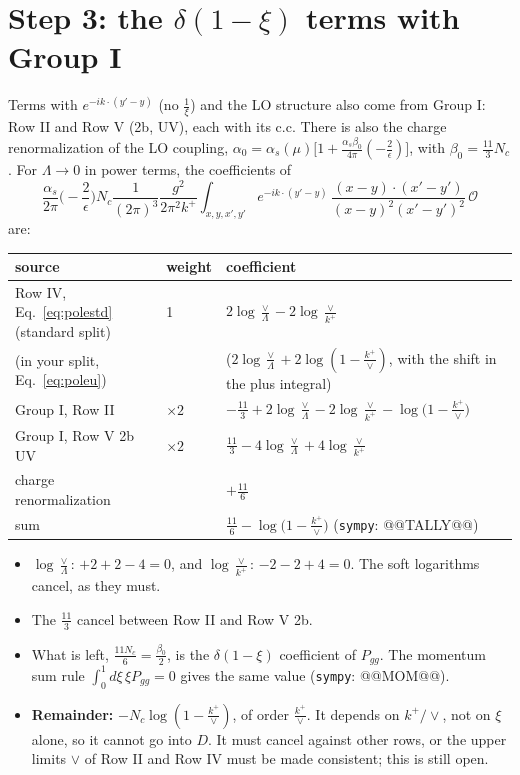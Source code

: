 \documentclass[10pt]{article}
\numberwithin{equation}{section}
\newcommand{\OO}{\mathcal O}
\newcommand{\preLO}{\frac{1}{(2\pi)^3}\frac{g^2}{2\pi^2k^+}}
\newcommand{\XX}{\frac{(x-y)\cdot(x'-y')}{(x-y)^{2}(x'-y')^{2}}}
\newcommand{\phone}{e^{-ik\cdot(y'-y)}}
\begin{document}
\section{Step 3: the \texorpdfstring{$\delta(1-\xi)$}{delta(1-xi)} terms with Group I}\label{sec:delta}
Terms with $\phone$ (no $\frac1\xi$) and the LO structure also come from Group I: Row II and Row V (2b, UV), each with its c.c. There is also the charge renormalization of the LO coupling, $\alpha_0=\alpha_s(\mu)\big[1+\frac{\alpha_s\beta_0}{4\pi}(-\frac2\epsilon)\big]$, with $\beta_0=\frac{11}{3}N_c$. For $\Lambda\to0$ in power terms, the coefficients of
\begin{equation*}
\frac{\alpha_s}{2\pi}\Big(-\frac{2}{\epsilon}\Big)N_c\preLO\int_{x,y,x',y'}\phone\,\XX\,\OO
\end{equation*}
are:
\begin{table}[H]\centering\small
\renewcommand{\arraystretch}{1.3}
\begin{tabular}{@{}lll@{}}\toprule
source & weight & coefficient\\\midrule
Row IV, Eq.~\eqref{eq:polestd} (standard split) & 1 & $2\log\frac{\vee}{\Lambda}-2\log\frac{\vee}{k^+}$\\
\quad (in your split, Eq.~\eqref{eq:poleu}) & & \quad ($2\log\frac{\vee}{\Lambda}+2\log(1-\frac{k^+}{\vee})$, with the shift in the plus integral)\\
Group I, Row II & $\times2$ & $-\frac{11}{3}+2\log\frac{\vee}{\Lambda}-2\log\frac{\vee}{k^+}-\log\big(1-\frac{k^+}{\vee}\big)$\\
Group I, Row V 2b UV & $\times2$ & $\frac{11}{3}-4\log\frac{\vee}{\Lambda}+4\log\frac{\vee}{k^+}$\\
charge renormalization & & $+\frac{11}{6}$\\\midrule
sum & & $\frac{11}{6}-\log\big(1-\frac{k^+}{\vee}\big)$ \quad(\texttt{sympy}: @@TALLY@@)\\\bottomrule
\end{tabular}
\end{table}
\begin{itemize}
\item $\log\frac{\vee}{\Lambda}$: $+2+2-4=0$, and $\log\frac{\vee}{k^+}$: $-2-2+4=0$. The soft logarithms cancel, as they must.
\item The $\frac{11}{3}$ cancel between Row II and Row V 2b.
\item What is left, $\frac{11N_c}{6}=\frac{\beta_0}{2}$, is the $\delta(1-\xi)$ coefficient of $P_{gg}$. The momentum sum rule $\int_0^1d\xi\,\xi P_{gg}=0$ gives the same value (\texttt{sympy}: @@MOM@@).
\item \textbf{Remainder:} $-N_c\log(1-\frac{k^+}{\vee})$, of order $\frac{k^+}{\vee}$. It depends on $k^+/\vee$, not on $\xi$ alone, so it cannot go into $D$. It must cancel against other rows, or the upper limits $\vee$ of Row II and Row IV must be made consistent; this is still open.
\end{itemize}
\end{document}
